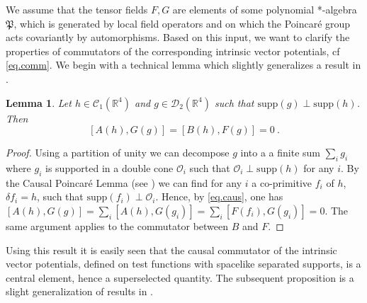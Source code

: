 \documentclass[11pt]{article}
\newtheorem{lemma}[theorem]{Lemma}
\numberwithin{equation}{section}
\newcommand{\RR}{{\mathbb R}}
\newcommand{\Cc}{{\mathcal{C}}}
\newcommand{\Dc}{{\mathcal{D}}}
\newcommand{\Oc}{{\mathcal{O}}}
\newcommand{\fP}{{\mathfrak P}}
\newcommand{\supp}{{\mathrm{supp}}}
\begin{document}
\medskip
We assume that the tensor fields $F, G$ are elements of some 
polynomial *-algebra $\fP$, which is generated by local field operators
and on which the Poincar\'e group acts covariantly by automorphisms. 
Based on this input, we want to clarify the properties of commutators of 
the corresponding intrinsic vector potentials, cf \eqref{eq.comm}. 
We begin with a technical lemma which slightly generalizes a result 
in \cite{BuCiRuVa1}. 
\begin{lemma}
\label{lem.2.1}
Let $h \in \Cc_1(\RR^4)$ and $g \in \Dc_2(\RR^4)$ such that  
$\supp(g) \perp \supp(h)$. Then
$$
[ A(h) , G(g) ]  =  [B(h),F(g)]=0 \   .
$$
\end{lemma}

\begin{proof}
Using a partition of unity we can decompose $g$ into a a finite sum 
$\sum_i g_i$ where $g_i$ is supported in a double cone $\Oc_i$ such 
that $\Oc_i \perp \supp (h)$ for any $i$.
By the Causal Poincar\'e Lemma (see \cite[Appendix]{BuCiRuVa1}) 
we can find for any $i$ a co-primitive $f_i$ of $h$,
$\delta f_i = h$, such that 
$\supp(f_i) \perp \Oc_i$. Hence, by \eqref{eq.caus}, one has  
$[ A(h) , G(g)] = \sum_i [A(h) , G(g_i)] = \sum_i [F(f_i) , G(g_i)]=0$. The 
same argument applies to the commutator between $B$ and $F$. 
\end{proof}

Using this result it is easily seen that the causal commutator of the 
intrinsic vector potentials, defined on test functions with
spacelike separated supports,   
is a central element, hence a superselected quantity.
The subsequent proposition is a slight generalization of 
results in \cite[Appendix]{BuCiRuVa1}.
\end{document}
